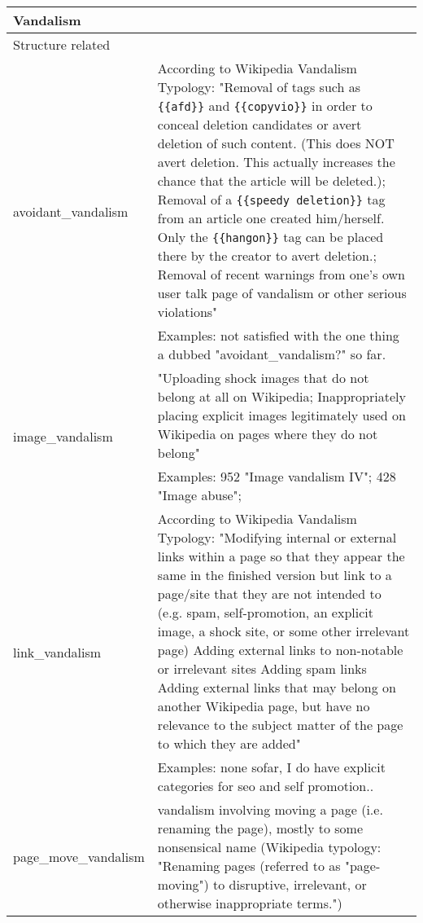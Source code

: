 \begin{longtable}{ | p{5cm} | p{9cm} | }
    \hline
        \multicolumn{2}{|l|}{\textbf{Vandalism}} \\
    \hline
        \multicolumn{2}{|l|}{Structure related} \\
    \hline
    \multirow{2}{*}{avoidant\_vandalism} & According to Wikipedia Vandalism Typology: "Removal of tags such as \verb|{{afd}}| and \verb|{{copyvio}}| in order to conceal deletion candidates or avert deletion of such content. (This does NOT avert deletion. This actually increases the chance that the article will be deleted.); Removal of a \verb|{{speedy deletion}}| tag from an article one created him/herself. Only the \verb|{{hangon}}| tag can be placed there by the creator to avert deletion.; Removal of recent warnings from one's own user talk page of vandalism or other serious violations"~\cite{Wikipedia:VandalismTypes} \\
                                     & Examples: not satisfied with the one thing a dubbed "avoidant\_vandalism?" so far.\\
    \hline
    \multirow{2}{*}{image\_vandalism} & "Uploading shock images that do not belong at all on Wikipedia; Inappropriately placing explicit images legitimately used on Wikipedia on pages where they do not belong"~\cite{Wikipedia:VandalismTypes} \\
                                     & Examples: 952 "Image vandalism IV"; 428 "Image abuse";\\
    \hline
    \multirow{2}{*}{link\_vandalism} & According to Wikipedia Vandalism Typology: "Modifying internal or external links within a page so that they appear the same in the finished version but link to a page/site that they are not intended to (e.g. spam, self-promotion, an explicit image, a shock site, or some other irrelevant page)
    Adding external links to non-notable or irrelevant sites
    Adding spam links
    Adding external links that may belong on another Wikipedia page, but have no relevance to the subject matter of the page to which they are added"~\cite{Wikipedia:VandalismTypes} \\
                               & Examples: none sofar, I do have explicit categories for seo and self promotion..\\ %
    \hline
    \multirow{2}{*}{page\_move\_vandalism} & vandalism involving moving a page (i.e. renaming the page), mostly to some nonsensical name
  (Wikipedia typology: "Renaming pages (referred to as "page-moving") to disruptive, irrelevant, or otherwise inappropriate terms.") \\

\end{longtable}
